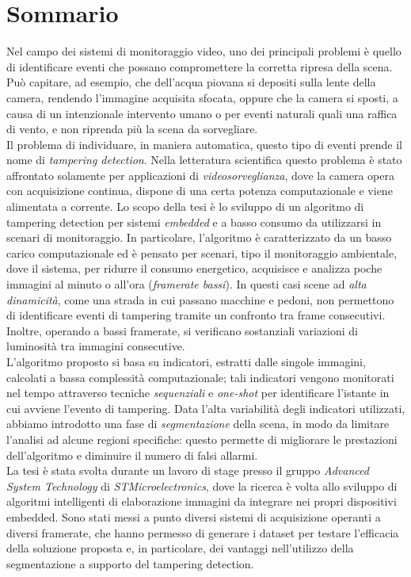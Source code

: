 \newpage
\chapter*{Sommario}


Nel campo dei sistemi di monitoraggio video, uno dei principali problemi \`e quello di identificare eventi che possano compromettere la corretta ripresa della scena.
Pu\`o capitare, ad esempio, che dell'acqua piovana si depositi sulla lente della camera, rendendo l'immagine acquisita sfocata, oppure che la camera si sposti, a causa di un intenzionale intervento umano o per eventi naturali quali una raffica di vento, e non riprenda pi\`u la scena da sorvegliare.\\
Il problema di individuare, in maniera automatica, questo tipo di eventi prende il nome di \textit{tampering detection}. 
Nella letteratura scientifica questo problema \`e stato affrontato solamente per applicazioni di \textit{videosorveglianza}, dove la camera opera con acquisizione continua, dispone di una certa potenza computazionale e viene alimentata a corrente.
Lo scopo della tesi \`e lo sviluppo di un algoritmo di tampering detection per sistemi \textit{embedded} e a basso consumo da utilizzarsi in scenari di monitoraggio. In particolare, l'algoritmo \`e caratterizzato da un basso carico computazionale ed \`e pensato per scenari, tipo il monitoraggio ambientale, dove il sistema, per ridurre il consumo energetico, acquisisce e analizza poche immagini al minuto o all'ora (\textit{framerate bassi}).
In questi casi scene ad \textit{alta dinamicit\`a}, come una strada in cui passano macchine e pedoni, non permettono di identificare eventi di tampering tramite un confronto tra frame consecutivi. 
Inoltre, operando a bassi framerate, si verificano sostanziali variazioni di luminosit\`a tra immagini consecutive. \\ 
L'algoritmo proposto si basa su indicatori, estratti dalle singole immagini, calcolati a bassa complessit\`a computazionale; tali indicatori vengono monitorati nel tempo attraverso tecniche \textit{sequenziali} e \textit{one-shot} per identificare l'istante in cui avviene l'evento di tampering.
Data l'alta variabilit\`a degli indicatori utilizzati, abbiamo introdotto una fase di \textit{segmentazione} della scena, in modo da limitare l'analisi ad alcune regioni specifiche:
questo permette di migliorare le prestazioni dell'algoritmo e diminuire il numero di falsi allarmi.\\
La tesi \`e stata svolta durante un lavoro di stage presso il gruppo \textit{Advanced System Technology} di \textit{STMicroelectronics}, dove la ricerca \`e volta allo sviluppo di algoritmi intelligenti di elaborazione immagini da integrare nei propri dispositivi embedded.
Sono stati messi a punto diversi sistemi di acquisizione operanti a diversi framerate, che hanno permesso di generare i dataset per testare l'efficacia della soluzione proposta e, in particolare, dei vantaggi nell'utilizzo della segmentazione a supporto del tampering detection. 
